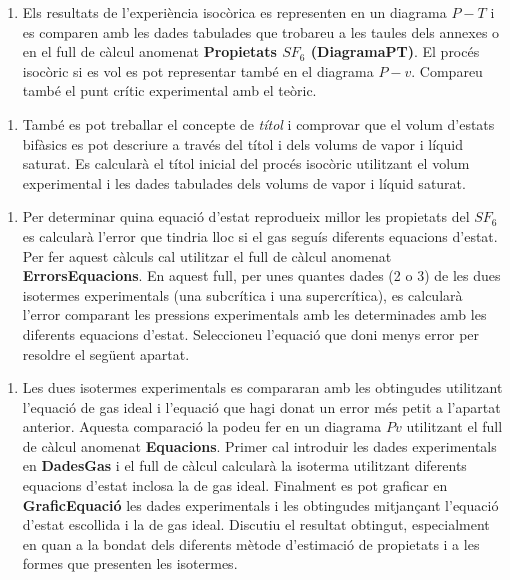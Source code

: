 \documentclass[a4paper]{article}
\begin{document}
\begin{enumerate}[resume]
    \item Els resultats de l’experiència isocòrica es representen en un diagrama $P-T$ i es comparen amb les dades tabulades que trobareu a les taules dels annexes o en el full de càlcul anomenat \textbf{Propietats $SF_6$ (DiagramaPT)}. El procés isocòric si es vol es pot representar també en el diagrama $P-v$. Compareu també el punt crític experimental amb el teòric.
\end{enumerate}

\begin{enumerate}[resume]
    \item També es pot treballar el concepte de \emph{títol} i comprovar que el volum d’estats bifàsics es pot descriure a través del títol i dels volums de vapor i líquid saturat. Es calcularà el títol inicial del procés isocòric utilitzant el volum experimental i les dades tabulades dels volums de vapor i líquid saturat.
\end{enumerate}

\begin{enumerate}[resume]
    \item Per determinar quina equació d’estat reprodueix millor les propietats del $SF_6$ es calcularà l’error que tindria lloc si el gas seguís diferents equacions d’estat. Per fer aquest càlculs cal utilitzar el full de càlcul anomenat \textbf{ErrorsEquacions}. En aquest full, per unes quantes dades (2 o 3) de les dues isotermes experimentals (una subcrítica i una supercrítica), es calcularà l’error comparant les pressions experimentals amb les determinades amb les diferents equacions d’estat. Seleccioneu l’equació que doni menys error per resoldre el següent apartat.
\end{enumerate}

\begin{enumerate}[resume]
    \item Les dues isotermes experimentals es compararan amb les obtingudes utilitzant l’equació de gas ideal i l’equació que hagi donat un error més petit a l’apartat anterior. Aquesta comparació la podeu fer en un diagrama $Pv$ utilitzant el full de càlcul anomenat \textbf{Equacions}. Primer cal introduir les dades experimentals en \textbf{DadesGas} i el full de càlcul calcularà la isoterma utilitzant diferents equacions d’estat inclosa la de gas ideal. Finalment es pot graficar en \textbf{GraficEquació} les dades experimentals i les obtingudes mitjançant l’equació d’estat escollida i la de gas ideal. Discutiu el resultat obtingut, especialment en quan a la bondat dels diferents mètode d’estimació de propietats i a les formes que presenten les isotermes.
\end{enumerate}
\end{document}
